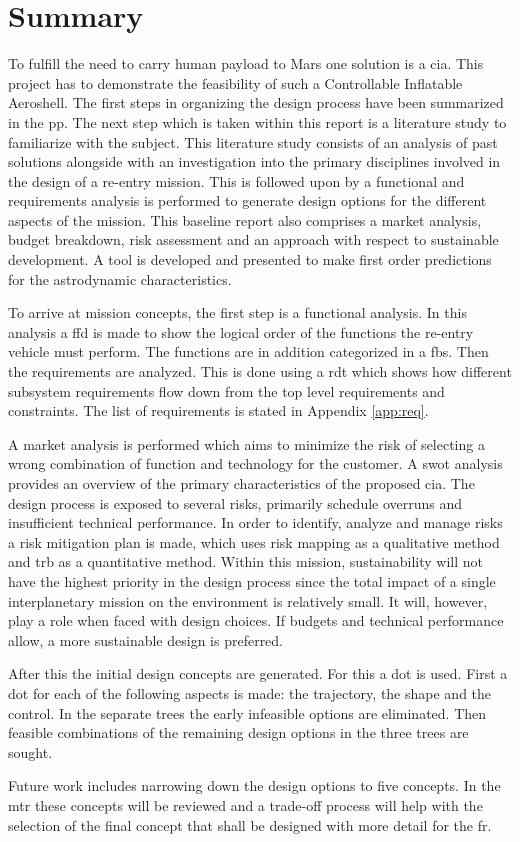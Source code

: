 \section*{Summary}\label{cha:summary}

To fulfill the need to carry human payload to Mars one solution is a \acrfull{cia}. This project has to demonstrate the feasibility of such a Controllable Inflatable Aeroshell. The first steps in organizing the design process have been summarized in the \acrfull{pp}. The next step which is taken within this report is a literature study to familiarize with the subject. This literature study consists of an analysis of past solutions alongside with an investigation into the primary disciplines involved in the design of a re-entry mission. This is followed upon by a functional and requirements analysis is performed to generate design options for the different aspects of the mission. This baseline report also comprises a market analysis, budget breakdown, risk assessment and an approach with respect to sustainable development. A tool is developed and presented to make first order predictions for the astrodynamic characteristics. 

To arrive at mission concepts, the first step is a functional analysis. In this analysis a \acrfull{ffd} is made to show the logical order of the functions the re-entry vehicle must perform. The functions are in addition categorized in a \acrfull{fbs}. Then the requirements are analyzed. This is done using a \gls{rdt} which shows how different subsystem requirements flow down from the top level requirements and constraints. The list of requirements is stated in Appendix \ref{app:req}.

A market analysis is performed which aims to minimize the risk of selecting a wrong combination of function and technology for the customer. A \acrfull{swot} analysis provides an overview of the primary characteristics of the proposed \gls{cia}. The design process is exposed to several risks, primarily schedule overruns and insufficient technical performance. In order to identify, analyze and manage risks a risk mitigation plan is made, which uses risk mapping as a qualitative method and \gls{trb} as a quantitative method. Within this mission, sustainability will not have the highest priority in the design process since the total impact of a single interplanetary mission on the environment is relatively small. It will, however, play a role when faced with design choices. If budgets and technical performance allow, a more sustainable design is preferred.

After this the initial design concepts are generated. For this a \gls{dot} is used. First a \gls{dot} for each of the following aspects is made: the trajectory, the shape and the control. In the separate trees the early infeasible options are eliminated. Then feasible combinations of the remaining design options in the three trees are sought.

Future work includes narrowing down the design options to five concepts. In the \acrfull{mtr} these concepts will be reviewed and a trade-off process will help with the selection of the final concept that shall be designed with more detail for the \acrfull{fr}.
